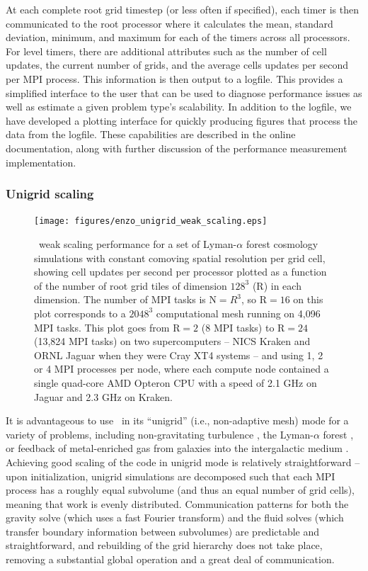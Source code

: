 At each complete root grid timestep (or less often if specified),
each timer is then communicated to the root processor where it
calculates the mean, standard deviation, minimum, and maximum for each
of the timers across all processors.  For level timers, there are additional
attributes such as the number of cell updates, the current number of
grids, and the average cells updates per second per MPI process.  This
information is then 
output to a logfile.  This provides a simplified interface to the user
that can be used to diagnose performance issues as well as estimate a
given problem type's scalability.  In addition to the logfile, we have
developed a plotting interface for quickly producing figures that
process the data from the logfile.  These capabilities are described
in the online documentation, along with further discussion of the
performance measurement implementation.

\subsubsection{Unigrid scaling}
\label{sec:weak_scaling}

\begin{figure}
\begin{center}
\texttt{[image: figures/enzo\_unigrid\_weak\_scaling.eps]}
\caption{\enzo\ weak scaling performance for a set of Lyman-$\alpha$
forest cosmology simulations with constant comoving spatial resolution
per grid cell, showing cell updates per second per processor 
plotted as a function of the number of root grid tiles of dimension
$128^3$ (R) in each dimension.  The number of MPI tasks is N$ = R^3$,
so R$ = 16$ on this plot corresponds to a $2048^3$ computational mesh
running on 4,096 MPI tasks.  This plot goes from R$ = 2$ (8 MPI tasks)
to R$ = 24$ (13,824 MPI tasks) on two supercomputers -- NICS Kraken
and ORNL Jaguar when they were Cray XT4 systems -- and using 1, 2 or 4
MPI processes per node, where each compute node contained a single
quad-core AMD Opteron CPU with a speed of 2.1 GHz on Jaguar and 2.3
GHz on Kraken.}
\label{fig.uniscale}
\end{center}
\end{figure}

It is advantageous to use \enzo\ in its ``unigrid'' (i.e.,
non-adaptive mesh) mode for a variety of problems, including
non-gravitating turbulence
\citep[e.g.,][]{2002ApJ...569L.127K,Kritsuk04}, the Lyman-$\alpha$ forest
\citep{2005MNRAS.361...70J,2009MNRAS.399.1934P}, or feedback of
metal-enriched gas from galaxies into the intergalactic medium
\citep{2004ApJ...601L.115N,2011ApJ...731....6S}.  Achieving good
scaling of the code in unigrid mode is relatively straightforward --
upon initialization, unigrid simulations are decomposed such that each
MPI process has a roughly equal subvolume (and thus an equal number of grid
cells), meaning that work is evenly distributed.  Communication
patterns for both the gravity solve (which uses a fast Fourier
transform) and the fluid solves (which transfer boundary information
between subvolumes) are predictable and straightforward, and
rebuilding of the grid hierarchy does not take place, removing a
substantial global operation and a great deal of communication.

